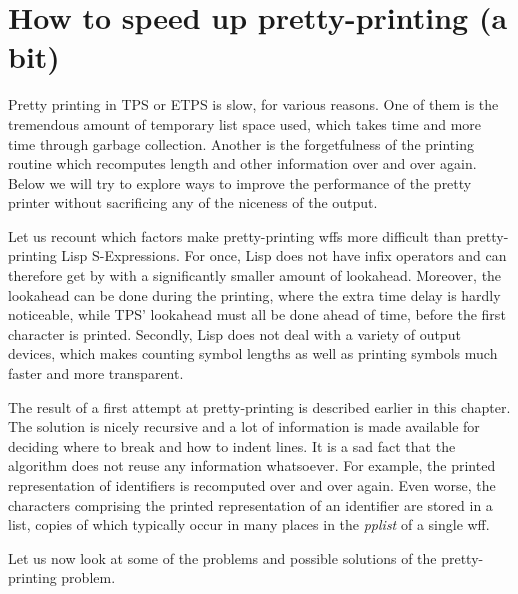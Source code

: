 \section{How to speed up pretty-printing (a bit)}

Pretty printing in TPS or ETPS is slow, for various reasons.  One of
them is the tremendous amount of temporary list space used, which takes
time and more time through garbage collection.  Another is the forgetfulness
of the printing routine which recomputes length and other information
over and over again.  Below we will try to explore ways to improve
the performance of the pretty printer without sacrificing any of the niceness
of the output.

Let us recount which factors make pretty-printing wffs more difficult than
pretty-printing Lisp S-Expressions.  For once, Lisp does not have infix
operators and can therefore get by with a significantly smaller amount of
lookahead.  Moreover, the lookahead can be done during the printing, where
the extra time delay is hardly noticeable, while TPS' lookahead must
all be done ahead of time, before the first character is printed.  Secondly,
Lisp does not deal with a variety of output devices, which makes counting
symbol lengths as well as printing symbols much faster and more transparent.

The result of a first attempt at pretty-printing is described earlier in this
chapter.  The solution is nicely recursive and a lot of information is made
available for deciding where to break and how to indent lines.  It is a sad
fact that the algorithm does not reuse any information whatsoever.  For example,
the printed representation of identifiers is recomputed over and over again.
Even worse, the characters comprising the printed representation of an
identifier are stored in a list, copies of which typically occur
in many places in the {\it pplist} of a single wff.

Let us now look at some of the problems and possible solutions of the
pretty-printing problem.

